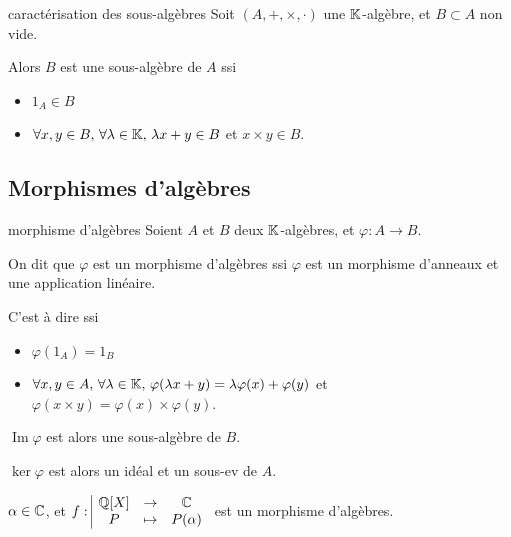 \begin{proposition}{caractérisation des sous-algèbres}{}
    Soit $(A, +, \times, \cdot)$ une $\mathbb{K}$-algèbre, et $B \subset A$ non vide. 

    Alors $B$ est une sous-algèbre de $A$ ssi 
    \begin{itemize}
        \item $1_A \in B$
        \item $\forall x, y \in B, \, \forall \lambda \in \mathbb{K}, \, \lambda x + y \in B$ et $x \times y \in B$.
    \end{itemize}
\end{proposition}

\subsection{Morphismes d'algèbres}

\begin{definition}{morphisme d'algèbres}{}
    Soient $A$ et $B$ deux $\mathbb{K}$-algèbres, et $\varphi : A \to B$.

    On dit que $\varphi$ est un morphisme d'algèbres ssi $\varphi$ est un 
    morphisme d'anneaux et une application linéaire.

    C'est à dire ssi 
    \begin{itemize}
        \item $\varphi(1_A) = 1_B$
        \item $\forall x, y \in A, \, \forall \lambda \in \mathbb{K}, \, \varphi(\lambda x + y) = \lambda \varphi(x) + \varphi(y)$
        et $\varphi(x \times y) = \varphi(x) \times \varphi(y)$.
    \end{itemize}
\end{definition}

\begin{remarque}
    $\operatorname{Im} \varphi$ est alors une sous-algèbre de $B$.

    $\ker \varphi$ est alors un idéal et un sous-ev de $A$.
\end{remarque}

\begin{exemple}
    $\alpha \in \mathbb{C}$, et $f: \space \begin{array}{|ccc} \displaystyle \mathbb{Q}[X] & \to & \displaystyle \mathbb{C} \\ \displaystyle P & \mapsto & \displaystyle P(\alpha) \end{array}$ est un morphisme d'algèbres.
\end{exemple}